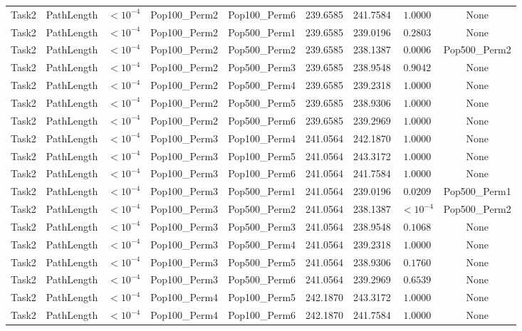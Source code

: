\documentclass[8pt]{article}
\begin{document}
\begin{longtable}{llccccccc}
Task2 & PathLength & $< 10^{-4}$ & Pop100\_Perm2 & Pop100\_Perm6 & 239.6585 & 241.7584 & $1.0000$ & None \\
Task2 & PathLength & $< 10^{-4}$ & Pop100\_Perm2 & Pop500\_Perm1 & 239.6585 & 239.0196 & $0.2803$ & None \\
Task2 & PathLength & $< 10^{-4}$ & Pop100\_Perm2 & Pop500\_Perm2 & 239.6585 & 238.1387 & $0.0006$ & Pop500\_Perm2 \\
Task2 & PathLength & $< 10^{-4}$ & Pop100\_Perm2 & Pop500\_Perm3 & 239.6585 & 238.9548 & $0.9042$ & None \\
Task2 & PathLength & $< 10^{-4}$ & Pop100\_Perm2 & Pop500\_Perm4 & 239.6585 & 239.2318 & $1.0000$ & None \\
Task2 & PathLength & $< 10^{-4}$ & Pop100\_Perm2 & Pop500\_Perm5 & 239.6585 & 238.9306 & $1.0000$ & None \\
Task2 & PathLength & $< 10^{-4}$ & Pop100\_Perm2 & Pop500\_Perm6 & 239.6585 & 239.2969 & $1.0000$ & None \\
Task2 & PathLength & $< 10^{-4}$ & Pop100\_Perm3 & Pop100\_Perm4 & 241.0564 & 242.1870 & $1.0000$ & None \\
Task2 & PathLength & $< 10^{-4}$ & Pop100\_Perm3 & Pop100\_Perm5 & 241.0564 & 243.3172 & $1.0000$ & None \\
Task2 & PathLength & $< 10^{-4}$ & Pop100\_Perm3 & Pop100\_Perm6 & 241.0564 & 241.7584 & $1.0000$ & None \\
Task2 & PathLength & $< 10^{-4}$ & Pop100\_Perm3 & Pop500\_Perm1 & 241.0564 & 239.0196 & $0.0209$ & Pop500\_Perm1 \\
Task2 & PathLength & $< 10^{-4}$ & Pop100\_Perm3 & Pop500\_Perm2 & 241.0564 & 238.1387 & $< 10^{-4}$ & Pop500\_Perm2 \\
Task2 & PathLength & $< 10^{-4}$ & Pop100\_Perm3 & Pop500\_Perm3 & 241.0564 & 238.9548 & $0.1068$ & None \\
Task2 & PathLength & $< 10^{-4}$ & Pop100\_Perm3 & Pop500\_Perm4 & 241.0564 & 239.2318 & $1.0000$ & None \\
Task2 & PathLength & $< 10^{-4}$ & Pop100\_Perm3 & Pop500\_Perm5 & 241.0564 & 238.9306 & $0.1760$ & None \\
Task2 & PathLength & $< 10^{-4}$ & Pop100\_Perm3 & Pop500\_Perm6 & 241.0564 & 239.2969 & $0.6539$ & None \\
Task2 & PathLength & $< 10^{-4}$ & Pop100\_Perm4 & Pop100\_Perm5 & 242.1870 & 243.3172 & $1.0000$ & None \\
Task2 & PathLength & $< 10^{-4}$ & Pop100\_Perm4 & Pop100\_Perm6 & 242.1870 & 241.7584 & $1.0000$ & None \\

\end{longtable}
\end{document}
